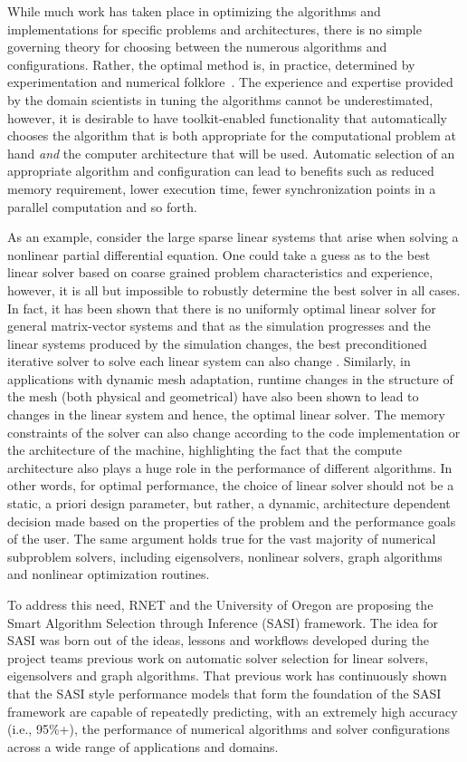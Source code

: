 While much work has taken place in optimizing the algorithms and implementations for specific problems and architectures, there is no simple governing theory for choosing between the numerous algorithms and configurations. Rather, the optimal method is, in practice, determined by experimentation and numerical folklore~\cite{EijkFuen2010:multistage}. The experience and expertise provided by the domain scientists in tuning the algorithms cannot be underestimated, however, it is desirable to have toolkit-enabled functionality that automatically chooses the algorithm that is both appropriate for the computational problem at hand \emph{and} the computer architecture that will be used. Automatic selection of an appropriate algorithm and configuration can lead to benefits such as reduced memory requirement, lower execution time, fewer synchronization points in a parallel computation and so forth. 

As an example, consider the large sparse linear systems that arise when solving a nonlinear partial differential equation. One could take a guess as to the best linear solver based on coarse grained problem characteristics and experience, however, it is all but impossible to robustly determine the best solver in all cases. In fact, it has been shown that there is no uniformly optimal linear solver for general matrix-vector systems and that as the simulation progresses and the linear systems produced by the simulation changes, the best preconditioned iterative solver to solve each linear system can also change \cite{Eller2012}. Similarly, in applications with dynamic mesh adaptation, runtime changes in the structure of the mesh (both physical and geometrical) have also been shown to lead to changes in the linear system and hence, the optimal linear solver. The memory constraints of the solver can also change according to the code implementation or the architecture of the machine, highlighting the fact that the compute architecture also plays a huge role in the performance of different algorithms. In other words, for optimal performance, the choice of linear solver should not be a static, a priori design parameter, but rather, a dynamic, architecture dependent decision made based on the properties of the problem and the performance goals of the user. The same argument holds true for the vast majority of numerical subproblem solvers, including eigensolvers, nonlinear solvers, graph algorithms and nonlinear optimization routines. 

To address this need, RNET and the University of Oregon are proposing the Smart Algorithm Selection through Inference (SASI) framework. The idea for SASI was born out of the ideas, lessons and workflows developed during the project teams previous work on automatic solver selection for linear solvers, eigensolvers and graph algorithms. That previous work has continuously shown that the SASI style performance models that form the foundation of the SASI framework are capable of repeatedly predicting, with an extremely high accuracy (i.e., 95\%+), the performance of numerical algorithms and solver configurations across a wide range of applications and domains.

